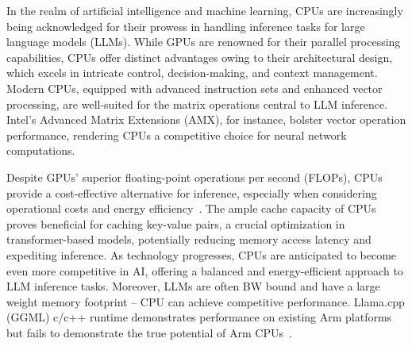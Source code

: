 \documentclass[conference]{IEEEtran}
\begin{document}
In the realm of artificial intelligence and machine learning, CPUs are increasingly being acknowledged for their prowess in handling inference tasks for large language models (LLMs). While GPUs are renowned for their parallel processing capabilities, CPUs offer distinct advantages owing to their architectural design, which excels in intricate control, decision-making, and context management. Modern CPUs, equipped with advanced instruction sets and enhanced vector processing, are well-suited for the matrix operations central to LLM inference. Intel's Advanced Matrix Extensions (AMX), for instance, bolster vector operation performance, rendering CPUs a competitive choice for neural network computations.

Despite GPUs' superior floating-point operations per second (FLOPs), CPUs provide a cost-effective alternative for inference, especially when considering operational costs and energy efficiency~\cite{intel_cpu_Shen_Chang_Dong_Luo_Meng_2023}. The ample cache capacity of CPUs proves beneficial for caching key-value pairs, a crucial optimization in transformer-based models, potentially reducing memory access latency and expediting inference. As technology progresses, CPUs are anticipated to become even more competitive in AI, offering a balanced and energy-efficient approach to LLM inference tasks. Moreover, LLMs are often BW bound and have a large weight memory footprint – CPU can achieve competitive performance. Llama.cpp (GGML) c/c++ runtime demonstrates performance on existing Arm platforms but fails to demonstrate the true potential of Arm CPUs~\cite{arm_cpu_llms}. 
\end{document}
